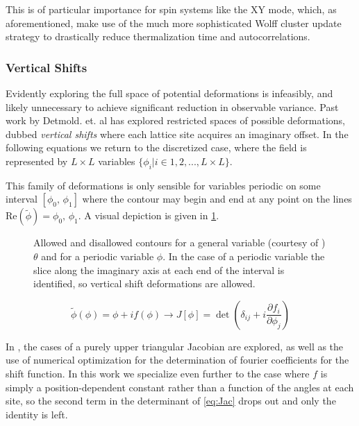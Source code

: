 \documentclass[12pt]{article}
\begin{document}
This is of particular importance for spin systems like the XY mode, which, as aforementioned, make use of the much more sophisticated Wolff 
cluster update strategy to drastically reduce thermalization time and autocorrelations.

\subsubsection{Vertical Shifts}

Evidently exploring the full space of potential deformations is infeasibly, and likely unnecessary to achieve significant reduction in observable
variance. Past work by Detmold. et. al \cite{Detmold_2021} has explored restricted spaces of possible deformations, dubbed \textit{vertical shifts} where 
each lattice site acquires an imaginary offset. In the following equations we return to the discretized case, where the field is represented
by $L\times L$ variables $\{\phi_i | i\in{1,2,...,L\times L}\}$.

This family of deformations is only sensible for variables periodic on some interval $[\phi_0,\,\phi_1]$ where the contour may begin and end at any point on the 
lines $\mathrm{Re}(\tilde{\phi}) = \phi_0,\,\phi_1$. A visual depiction is given in \ref{fig:contours}.

\begin{figure}
	\begin{center}
	
	\end{center}
	\caption{Allowed and disallowed contours for a general variable (courtesy of \cite{Detmold_2021}) $\theta$ and for a periodic variable $\phi$.
	In the case of a periodic variable the slice along the imaginary axis at each end of the interval is identified, 
	so vertical shift deformations are allowed.}
	\label{fig:contours}
\end{figure}

\begin{equation} \label{eq:Jac}
	\tilde{\phi}(\phi) = \phi + if(\phi) \rightarrow J[\phi] = \det\left(\delta_{ij} + i \frac{\partial f_i}{\partial \phi_j} \right)
\end{equation}

In \cite{Detmold_2021}, the cases of a purely upper triangular Jacobian are explored, as well as the use of numerical optimization for the determination of fourier coefficients
for the shift function. In this work we specialize even further to the case where $f$ is simply a position-dependent constant rather than a function of the angles
at each site, so the second term in the determinant of \ref{eq:Jac} drops out and only the identity is left. 
\end{document}
